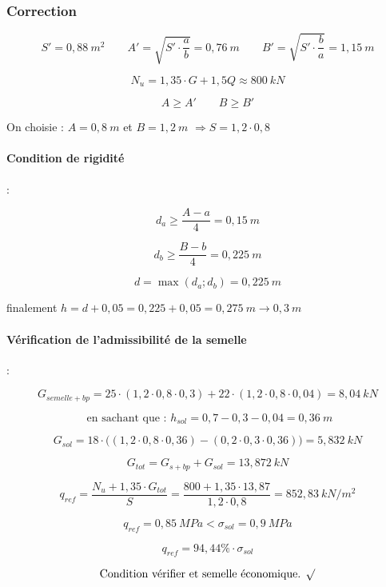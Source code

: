 \documentclass[12pt,a4paper]{article}
\begin{document}
	
	
	\vspace{\baselineskip}
	
	\subsubsection{Correction}
	
	\[ S'=0,88~\unit{m^{2}} \qquad A'= \sqrt{S' \cdot \dfrac{a}{b}} = 0,76~\unit{m} \qquad B'=\sqrt{S' \cdot \dfrac{b}{a}} = 1,15~\unit{m} \]
	
	\[ N_{u} = 1,35 \cdot G + 1,5 Q \approx 800~\unit{kN} \]
	
	
	\[ A\geq A' \qquad B\geq B' \]
	
	On choisie : $A = 0,8~\unit{m}$ et $B=1,2~\unit{m}$ $\Rightarrow S = 1,2 \cdot 0,8$
	
	\paragraph{Condition de rigidité} :
	
	\[ d_{a} \geq \dfrac{A - a}{4} = 0,15~\unit{m} \]
	
	\[ d_{b} \geq \dfrac{B - b}{4} = 0,225~\unit{m} \]
	
	
	\[ d = \max (d_{a};d_{b}) = 0,225~\unit{m} \]
	
	finalement $h = d + 0,05 = 0,225+0,05 = 0,275~\unit{m} \rightarrow 0,3~\unit{m}$
	
	
	\paragraph{Vérification de l'admissibilité de la semelle} :
	
	\[ G_{semelle+bp} = 25 \cdot (1,2 \cdot 0,8 \cdot 0,3) + 22 \cdot (1,2 \cdot 0,8 \cdot 0,04) = 8,04~\unit{kN} \]
	
	
	\[ \text{ en sachant que : } h_{sol} = 0,7-0,3-0,04 = 0,36~\unit{m} \]
	
	\[ G_{sol} = 18 \cdot \bigg( (1,2 \cdot 0,8 \cdot 0,36) - (0,2 \cdot 0,3 \cdot 0,36) \bigg) = 5,832~\unit{kN} \]
	
	\vspace{\baselineskip}
	
	\[ G_{tot} = G_{s+bp}+G_{sol} = 13,872~\unit{kN} \]
	
	\[ q_{ref} = \dfrac{N_{u}+1,35 \cdot G_{tot}}{S} = \dfrac{800 + 1,35 \cdot 13,87}{1,2 \cdot 0,8} = 852,83~\unit{kN\per m^{2}} \]
	
	
	\[ q_{ref} = 0,85~\unit{MPa} < \sigma_{sol} = 0,9~\unit{MPa} \]
	
	\[ q_{ref} = 94,44\% \cdot \sigma_{sol} \]
	
	\[ \text{Condition vérifier et semelle économique. } \surd \]
	
	
	
	
	
	
	
	
	
	
	
	
	
	
	
	
	
	
\end{document}
